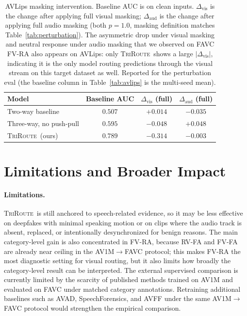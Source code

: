 \documentclass{article}
\newcommand{\method}{\textsc{TriRoute}}
\begin{document}
\begin{table}[t]
    \centering
    \caption{AVLips masking intervention. Baseline AUC is on clean inputs. $\Delta_\mathrm{vis}$ is the change after applying full visual masking; $\Delta_\mathrm{aud}$ is the change after applying full audio masking (both $p=1.0$, masking definition matches Table~\ref{tab:perturbation}). The asymmetric drop under visual masking and neutral response under audio masking that we observed on FAVC FV-RA also appears on AVLips: only \method\ shows a large $|\Delta_\mathrm{vis}|$, indicating it is the only model routing predictions through the visual stream on this target dataset as well. Reported for the perturbation eval (the baseline column in Table~\ref{tab:avlips} is the multi-seed mean).}
    \label{tab:avlips_perturbation}
    \small
    \begin{tabular}{lccc}
        \toprule
        Model & Baseline AUC & $\Delta_\mathrm{vis}$ (full) & $\Delta_\mathrm{aud}$ (full) \\
        \midrule
        Two-way baseline        & $0.507$ & $+0.014$ & $-0.035$ \\
        Three-way, no push-pull & $0.595$ & $-0.048$ & $+0.048$ \\
        \method\ (ours)         & $\mathbf{0.789}$ & $\mathbf{-0.314}$ & $-0.003$ \\
        \bottomrule
    \end{tabular}
\end{table}

\section{Limitations and Broader Impact}

\paragraph{Limitations.}
\method\ is still anchored to speech-related evidence, so it may be less effective on deepfakes with minimal speaking motion or on clips where the audio track is absent, replaced, or intentionally desynchronized for benign reasons. The main category-level gain is also concentrated in FV-RA, because RV-FA and FV-FA are already near ceiling in the AV1M$\rightarrow$FAVC protocol; this makes FV-RA the most diagnostic setting for visual routing, but it also limits how broadly the category-level result can be interpreted. The external supervised comparison is currently limited by the scarcity of published methods trained on AV1M and evaluated on FAVC under matched category annotations. Retraining additional baselines such as AVAD, SpeechForensics, and AVFF under the same AV1M$\rightarrow$FAVC protocol would strengthen the empirical comparison.
\end{document}
